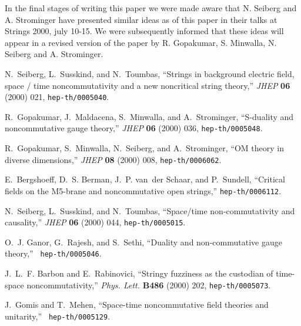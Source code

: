 \documentclass[a4paper,twoside,titlepage,12pt]{article}
\begin{document}
In the final stages of writing this paper we were 
made aware that N. Seiberg and A. Strominger have presented
similar ideas as of this paper in their talks at Strings 2000, july 10-15.
We were subsequently informed that these ideas will appear in
a revised version of the paper \cite{Gopakumar:2000ep} 
by R. Gopakumar, S. Minwalla, N. Seiberg and A. Strominger.




\providecommand{\href}[2]{#2}\begingroup\raggedright\begin{thebibliography}{10}
N.~Seiberg, L.~Susskind, and N.~Toumbas, ``Strings in background electric
  field, space / time noncommutativity and a new noncritical string theory,''
  {\em JHEP} {\bf 06} (2000) 021,
  \href{http://xxx.lanl.gov/abs/hep-th/0005040}{{\tt hep-th/0005040}}.

R.~Gopakumar, J.~Maldacena, S.~Minwalla, and A.~Strominger, ``S-duality and
  noncommutative gauge theory,'' {\em JHEP} {\bf 06} (2000) 036,
  \href{http://xxx.lanl.gov/abs/hep-th/0005048}{{\tt hep-th/0005048}}.

R.~Gopakumar, S.~Minwalla, N.~Seiberg, and A.~Strominger, ``{OM} theory in
  diverse dimensions,'' {\em JHEP} {\bf 08} (2000) 008,
  \href{http://xxx.lanl.gov/abs/hep-th/0006062}{{\tt hep-th/0006062}}.

E.~Bergshoeff, D.~S. Berman, J.~P. van~der Schaar, and P.~Sundell, ``Critical
  fields on the {M5}-brane and noncommutative open strings,''
  \href{http://xxx.lanl.gov/abs/hep-th/0006112}{{\tt hep-th/0006112}}.

N.~Seiberg, L.~Susskind, and N.~Toumbas, ``Space/time non-commutativity and
  causality,'' {\em JHEP} {\bf 06} (2000) 044,
  \href{http://xxx.lanl.gov/abs/hep-th/0005015}{{\tt hep-th/0005015}}.

O.~J. Ganor, G.~Rajesh, and S.~Sethi, ``Duality and non-commutative gauge
  theory,'' \href{http://xxx.lanl.gov/abs/hep-th/0005046}{{\tt
  hep-th/0005046}}.

J.~L.~F. Barbon and E.~Rabinovici, ``Stringy fuzziness as the custodian of
  time-space noncommutativity,'' {\em Phys. Lett.} {\bf B486} (2000) 202,
  \href{http://xxx.lanl.gov/abs/hep-th/0005073}{{\tt hep-th/0005073}}.

J.~Gomis and T.~Mehen, ``Space-time noncommutative field theories and
  unitarity,'' \href{http://xxx.lanl.gov/abs/hep-th/0005129}{{\tt
  hep-th/0005129}}.


\end{thebibliography}
\end{document}
